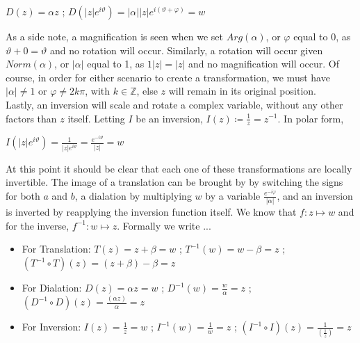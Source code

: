 \documentclass[a4paper,man,natbib]{apa6}
\newcommand{\Z}{\mathbb{Z}}  %
\begin{document}
\begin{center}

      $ D(z) = \alpha z $ ; $ D(|z|e^{i\vartheta}) = |\alpha ||z|e^{i(\vartheta + \varphi)} = w $ 

\end{center}

As a side note, a magnification is seen when we set $ Arg(\alpha) $, or $ \varphi $ equal to 0, as $ \vartheta + 0 = \vartheta $ and no rotation will occur.
Similarly, a rotation will occur given $ Norm(\alpha) $, or $ |\alpha| $ equal to 1, as $ 1|z| = |z| $ and no magnification will occur.
Of course, in order for either scenario to create a transformation, we must have $ |\alpha| \neq 1 $ or $ \varphi \neq 2k\pi $, with $ k \in \Z $, else $ z $ will remain in its original position.
\\
Lastly, an inversion will scale and rotate a complex variable, without any other factors than $ z $ itself.
Letting $ I $ be an inversion, $ I(z) \coloneqq \frac{1}{z} = z^{-1}$. In polar form, 

\begin{center}

      $ I(|z|e^{i\vartheta}) = \frac{1}{|z|e^{i\vartheta}} = \frac{e^{-i\vartheta}}{|z|} = w $ 

\end{center}

At this point it should be clear that each one of these transformations are locally invertible. 
The image of a translation can be brought by by switching the signs for both $ a $ and $ b $, 
a dialation by multiplying $ w $ by a variable $ \frac{e^{-i\varphi}}{|\alpha|} $, and an inversion is inverted by reapplying the inversion function itself.
We know that $ f : z \mapsto w $ and for the inverse, $  f^{-1}: w \mapsto z $. Formally we write ... 

\begin{itemize}

      \item For Translation: $ T(z) = z + \beta = w $ ; $ T^{-1}(w) = w - \beta = z $ ; $ (T^{-1} \circ  T)(z) = (z + \beta) - \beta = z  $
      
      \item For Dialation: $ D(z) = \alpha z = w $ ; $ D^{-1}(w) = \frac{w}{\alpha} = z $ ; $ (D^{-1} \circ  D)(z) = \frac{(\alpha z)}{\alpha} = z $
      
      \item For Inversion: $ I(z) = \frac{1}{z} = w $ ; $ I^{-1}(w) = \frac{1}{w} = z $ ; $ (I^{-1} \circ  I)(z) = \frac{1}{(\frac{1}{z})} = z $
      
\end{itemize}
\end{document}
